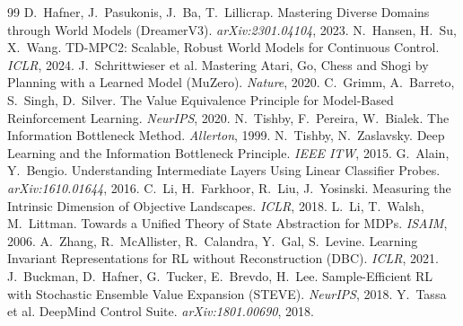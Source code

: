 \documentclass[twocolumn,10pt]{article}
\begin{document}
\begin{thebibliography}{99}\small
{} D.~Hafner, J.~Pasukonis, J.~Ba, T.~Lillicrap.
Mastering Diverse Domains through World Models (DreamerV3). \emph{arXiv:2301.04104}, 2023.
 N.~Hansen, H.~Su, X.~Wang. TD-MPC2: Scalable,
Robust World Models for Continuous Control. \emph{ICLR}, 2024.
 J.~Schrittwieser et al. Mastering Atari, Go,
Chess and Shogi by Planning with a Learned Model (MuZero). \emph{Nature}, 2020.
 C.~Grimm, A.~Barreto, S.~Singh, D.~Silver. The Value
Equivalence Principle for Model-Based Reinforcement Learning. \emph{NeurIPS}, 2020.
 N.~Tishby, F.~Pereira, W.~Bialek. The Information
Bottleneck Method. \emph{Allerton}, 1999.
 N.~Tishby, N.~Zaslavsky. Deep Learning and the
Information Bottleneck Principle. \emph{IEEE ITW}, 2015.
 G.~Alain, Y.~Bengio. Understanding Intermediate
Layers Using Linear Classifier Probes. \emph{arXiv:1610.01644}, 2016.
 C.~Li, H.~Farkhoor, R.~Liu, J.~Yosinski. Measuring
the Intrinsic Dimension of Objective Landscapes. \emph{ICLR}, 2018.
 L.~Li, T.~Walsh, M.~Littman. Towards a Unified
Theory of State Abstraction for MDPs. \emph{ISAIM}, 2006.
 A.~Zhang, R.~McAllister, R.~Calandra, Y.~Gal, S.~Levine.
Learning Invariant Representations for RL without Reconstruction (DBC).
\emph{ICLR}, 2021.
 J.~Buckman, D.~Hafner, G.~Tucker, E.~Brevdo, H.~Lee.
Sample-Efficient RL with Stochastic Ensemble Value Expansion (STEVE). \emph{NeurIPS}, 2018.
 Y.~Tassa et al. DeepMind Control Suite.
\emph{arXiv:1801.00690}, 2018.
\end{thebibliography}
\end{document}
